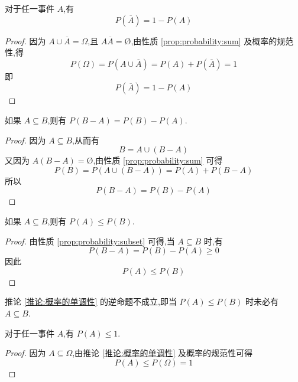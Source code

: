 \begin{property}
    \indent 对于任一事件 $A$,有
    \begin{equation}
        P(\overline{A})=1-P(A)
    \end{equation}
\end{property}

\begin{proof}
    因为 $A \cup \overline{A} = \varOmega$,且 $A \overline{A} = \text{\O}$,由性质 \ref{prop:probability:sum} 及概率的规范性,得
    $$
    P(\varOmega) = P(A \cup \overline{A}) = P(A) + P(\overline{A}) = 1
    $$
    即
    \[
    P(\overline{A})=1-P(A)
    \]
\end{proof}

\begin{property}
    \indent 如果 $A \subseteq B$,则有 $P(B-A)=P(B)-P(A)$.
\end{property}

\begin{proof}
    因为 $A \subseteq B$,从而有
    $$
    B = A \cup (B-A)
    $$
    又因为 $A(B-A)=\text{\O}$,由性质 \ref{prop:probability:sum} 可得
    $$
    P(B) = P(A \cup (B-A)) = P(A) + P(B-A)
    $$
    所以
    $$
    P(B-A)=P(B)-P(A)
    $$
\end{proof}

\begin{corollary}[][概率的单调性][推论:概率的单调性]
    \indent 如果 $A \subseteq B$,则有 $P(A) \leqslant P(B)$.
\end{corollary}

\begin{proof}
    由性质 \ref{prop:probability:subset} 可得,当 $A \subseteq B$ 时,有
    $$
    P(B-A) = P(B)-P(A) \geqslant 0
    $$
    因此
    $$
    P(A) \leqslant P(B)
    $$
\end{proof}

\begin{note}
    \indent 推论 \ref{推论:概率的单调性} 的逆命题不成立,即当 $P(A) \leqslant P(B)$ 时未必有 $A \subseteq B$.
\end{note}

\begin{property}[][][prop:probability:<=1]
    \indent 对于任一事件 $A$,有 $P(A) \leqslant 1$.
\end{property}

\begin{proof}
    因为 $A \subseteq \varOmega$,由推论 \ref{推论:概率的单调性} 及概率的规范性可得
    \[
    P(A) \leqslant P(\varOmega) = 1
    \]

    \vspace{-2em}
\end{proof}

